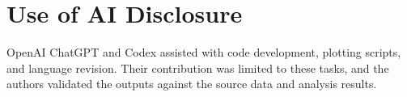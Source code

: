 \section{Use of AI Disclosure}

OpenAI ChatGPT and Codex assisted with code development, plotting scripts, and
language revision. Their contribution was limited to these tasks, and the
authors validated the outputs against the source data and analysis results.
